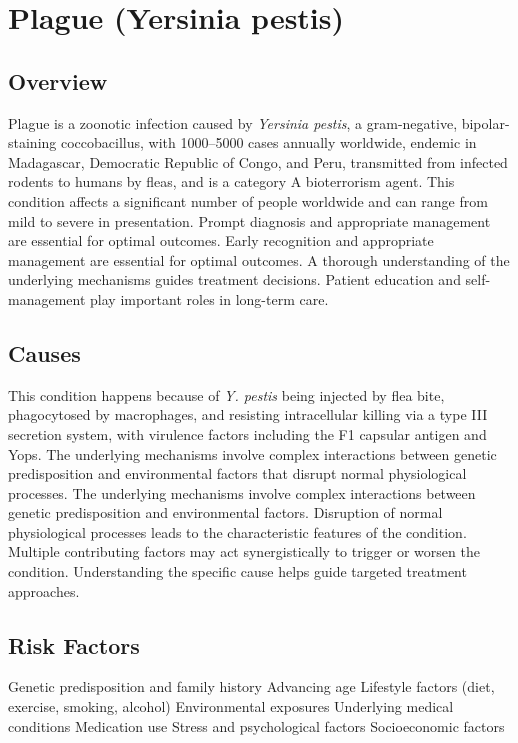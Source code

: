 \chapter{Plague (Yersinia pestis)}
\label{sec:Plague}

\section{Overview}
Plague is a zoonotic infection caused by \textit{Yersinia pestis}, a gram-negative, bipolar-staining coccobacillus, with 1000--5000 cases annually worldwide, endemic in Madagascar, Democratic Republic of Congo, and Peru, transmitted from infected rodents to humans by fleas, and is a category A bioterrorism agent. This condition affects a significant number of people worldwide and can range from mild to severe in presentation. Prompt diagnosis and appropriate management are essential for optimal outcomes. Early recognition and appropriate management are essential for optimal outcomes. A thorough understanding of the underlying mechanisms guides treatment decisions. Patient education and self-management play important roles in long-term care.
\section{Causes}
This condition happens because of \textit{Y. pestis} being injected by flea bite, phagocytosed by macrophages, and resisting intracellular killing via a type III secretion system, with virulence factors including the F1 capsular antigen and Yops. The underlying mechanisms involve complex interactions between genetic predisposition and environmental factors that disrupt normal physiological processes. The underlying mechanisms involve complex interactions between genetic predisposition and environmental factors. Disruption of normal physiological processes leads to the characteristic features of the condition. Multiple contributing factors may act synergistically to trigger or worsen the condition. Understanding the specific cause helps guide targeted treatment approaches.
\section{Risk Factors}
Genetic predisposition and family history Advancing age Lifestyle factors (diet, exercise, smoking, alcohol) Environmental exposures Underlying medical conditions Medication use Stress and psychological factors Socioeconomic factors

